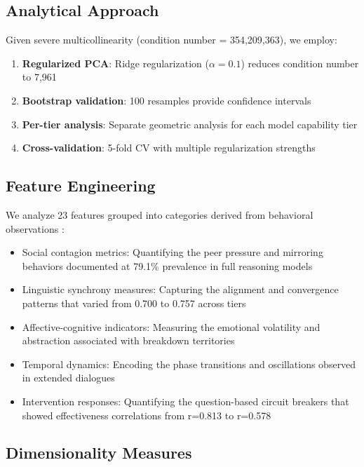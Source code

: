 \documentclass[11pt,letterpaper]{article}
\newcommand{\featureCount}{23}
\newcommand{\conditionNumber}{354,209,363}
\newcommand{\regularizedConditionNumber}{7,961}
\newcommand{\regularizationAlpha}{0.1}
\newcommand{\bootstrapSamples}{100}
\newcommand{\fullReasoningPeerPressure}{79.1\%}
\newcommand{\fullQuestionCorrelation}{0.813}
\newcommand{\nonQuestionCorrelation}{0.578}
\newcommand{\fullLinguisticAlignment}{0.700}
\newcommand{\nonLinguisticAlignment}{0.757}
\begin{document}
\subsection{Analytical Approach}

Given severe multicollinearity (condition number = \conditionNumber{}), we employ:

\begin{enumerate}
    \item \textbf{Regularized PCA}: Ridge regularization ($\alpha = \regularizationAlpha{}$) reduces condition number to \regularizedConditionNumber{}
    \item \textbf{Bootstrap validation}: \bootstrapSamples{} resamples provide confidence intervals
    \item \textbf{Per-tier analysis}: Separate geometric analysis for each model capability tier
    \item \textbf{Cross-validation}: 5-fold CV with multiple regularization strengths
\end{enumerate}

\subsection{Feature Engineering}

We analyze \featureCount{} features grouped into categories derived from behavioral observations \citep{garcia2025peer}:
\begin{itemize}
    \item Social contagion metrics: Quantifying the peer pressure and mirroring behaviors documented at \fullReasoningPeerPressure{} prevalence in full reasoning models
    \item Linguistic synchrony measures: Capturing the alignment and convergence patterns that varied from \fullLinguisticAlignment{} to \nonLinguisticAlignment{} across tiers
    \item Affective-cognitive indicators: Measuring the emotional volatility and abstraction associated with breakdown territories
    \item Temporal dynamics: Encoding the phase transitions and oscillations observed in extended dialogues
    \item Intervention responses: Quantifying the question-based circuit breakers that showed effectiveness correlations from r=\fullQuestionCorrelation{} to r=\nonQuestionCorrelation{}
\end{itemize}

\subsection{Dimensionality Measures}
\end{document}
